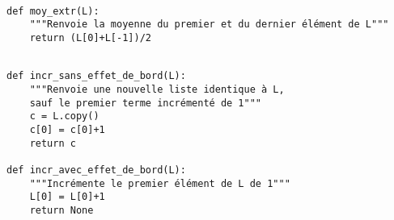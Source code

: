 \exer{}
\setcounter{numques}{0}

\question{} 
\begin{lstlisting}

def moy_extr(L):
    """Renvoie la moyenne du premier et du dernier élément de L"""
    return (L[0]+L[-1])/2
\end{lstlisting}


\medskip{}

\question{} 
\begin{lstlisting}

def incr_sans_effet_de_bord(L):
    """Renvoie une nouvelle liste identique à L, 
    sauf le premier terme incrémenté de 1"""
    c = L.copy()
    c[0] = c[0]+1
    return c

def incr_avec_effet_de_bord(L):
    """Incrémente le premier élément de L de 1"""
    L[0] = L[0]+1
    return None
\end{lstlisting}
